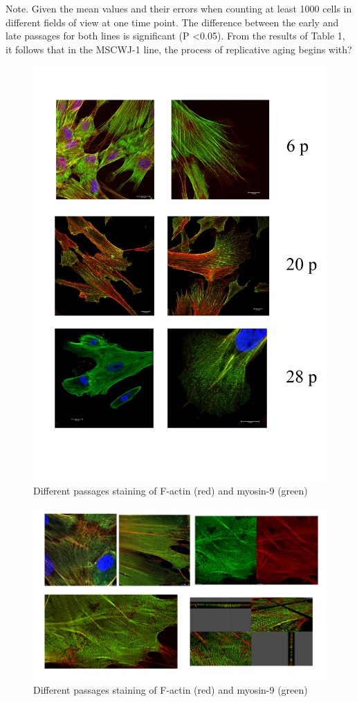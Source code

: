 \documentclass[a4paper,12pt]{article}
\begin{document}
Note. Given the mean values and their errors when counting at least 1000 cells in different fields of view at one time point. The difference between the early and late passages for both lines is significant (P <0.05).
  From the results of Table 1, it follows that in the MSCWJ-1 line, the process of replicative aging begins with?


\begin{figure}[hbt!]
\centering
\includegraphics[width=0.8\linewidth]{fig1.jpg}
\caption{Different passages staining of F-actin (red) and myosin-9 (green)}
\label{fig:fig1}
\end{figure}

\begin{figure}[hbt!]
\centering
\includegraphics[width=0.8\linewidth]{fig7.png}
\caption{Different passages staining of F-actin (red) and myosin-9 (green)}
\label{fig:fig7}
\end{figure}
\end{document}
